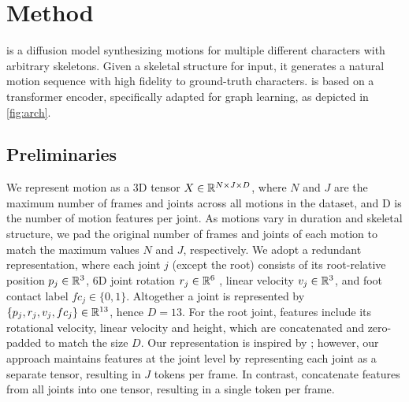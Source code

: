 
\section{Method}\label{sec:method}


\algoname is a diffusion model synthesizing motions for multiple different characters with arbitrary skeletons. Given a skeletal structure for input, it generates a natural motion sequence with high fidelity to ground-truth characters.
\algoname is based on a transformer encoder, specifically adapted for graph learning, as depicted in \cref{fig:arch}.

\subsection{Preliminaries} \label{sec:prelim}

We represent motion as a 3D tensor $X\in \mathbb{R} ^ {N \times J \times D}$, where $N$ and $J$ are the maximum number of frames and joints across all motions in the dataset, and D is the number of motion features per joint. 
As motions vary in duration and skeletal structure, we pad the original number of frames and joints of each motion to match the maximum values $N$ and $J$, respectively.
We adopt a redundant representation, where each joint $j$ (except the root) consists of its root-relative position $p_j\in\mathbb{R}^3$, 6D joint rotation $r_j\in\mathbb{R}^6$ \cite{DBLP:journals/corr/abs-1812-07035}, linear velocity $v_j\in\mathbb{R}^3$, and foot contact label $fc_j \in \{0, 1\}$.
Altogether a joint is represented by $\{p_j,r_j,v_j,fc_j\}\in\mathbb{R}^{13}$, hence
 $D=13$. 
For the root joint, features include its rotational velocity, linear velocity and height, which are concatenated and zero-padded to match the size $D$.
Our representation is inspired by \citet{guo2022generating}; however, our approach maintains features at the joint level by representing each joint as a separate tensor, resulting in $J$ tokens per frame. In contrast, \citeauthor{guo2022generating} concatenate features from all joints into one tensor, resulting in a single token per frame. 


